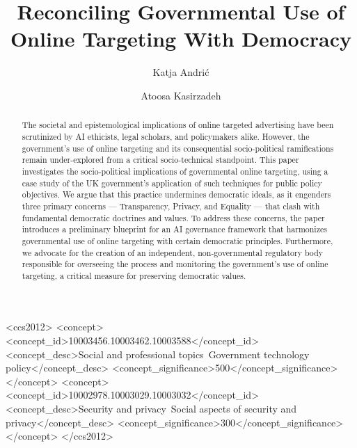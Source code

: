 \documentclass[preprint]{acmart}
\begin{document}
\title{Reconciling Governmental Use of Online Targeting With Democracy}
\author{Katja Andrić}

\author{Atoosa Kasirzadeh}
\renewcommand{\shortauthors}{Andrić and Kasirzadeh}
\begin{abstract}
The societal and epistemological implications of online targeted advertising have been scrutinized by AI ethicists, legal scholars, and policymakers alike. However, the government's use of online targeting and its consequential socio-political ramifications remain under-explored from a critical socio-technical standpoint. This paper investigates the socio-political implications of governmental online targeting, using a case study of the UK government's application of such techniques for public policy objectives. We argue that this practice undermines democratic ideals, as it engenders three primary concerns --- Transparency, Privacy, and Equality --- that clash with fundamental democratic doctrines and values. To address these concerns, the paper introduces a preliminary blueprint for an AI governance framework that harmonizes governmental use of online targeting with certain democratic principles. Furthermore, we advocate for the creation of an independent, non-governmental regulatory body responsible for overseeing the process and monitoring the government's use of online targeting, a critical measure for preserving democratic values.\end{abstract}
\begin{CCSXML}
<ccs2012>
 <concept>
 <concept_id>10003456.10003462.10003588</concept_id>
 <concept_desc>Social and professional topics~Government technology policy</concept_desc>
 <concept_significance>500</concept_significance>
 </concept>
 <concept>
 <concept_id>10002978.10003029.10003032</concept_id>
 <concept_desc>Security and privacy~Social aspects of security and privacy</concept_desc>
 <concept_significance>300</concept_significance>
 </concept>
 </ccs2012>
\end{CCSXML}

\maketitle
\end{document}
